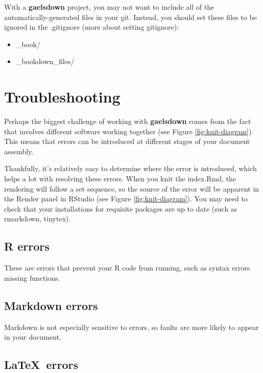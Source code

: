 \documentclass[12pt, oneside]{queensuthesis}
\numberwithin{equation}{chapter}       %
\providecommand{\tightlist}{%
  \setlength{\itemsep}{0pt}\setlength{\parskip}{0pt}}
\begin{document}
With a \textbf{gaelsdown} project, you may not want to include all of the automatically-generated files in your git. Instead, you should set these files to be ignored in the .gitignore (more about setting gitignore):
\begin{itemize}
\tightlist
\item
  \_book/
\item
  \_bookdown\_files/
\end{itemize}
\hypertarget{troubleshooting}{%
\section{Troubleshooting}\label{troubleshooting}}

Perhaps the biggest challenge of working with \textbf{gaelsdown} comes from the fact that involves different software working together (see Figure \ref{fig:knit-diagram}). This means that errors can be introduced at different stages of your document assembly.

Thankfully, it's relatively easy to determine where the error is introduced, which helps a lot with resolving these errors. When you knit the index.Rmd, the rendering will follow a set sequence, so the source of the error will be apparent in the Render panel in RStudio (see Figure \ref{fig:knit-diagram}). You may need to check that your installations for requisite packages are up to date (such as rmarkdown, tinytex).

\hypertarget{r-errors}{%
\subsection{R errors}\label{r-errors}}

These are errors that prevent your R code from running, such as syntax errors missing functions.

\hypertarget{markdown-errors}{%
\subsection{Markdown errors}\label{markdown-errors}}

Markdown is not especially sensitive to errors, so faults are more likely to appear in your document.

\hypertarget{errors}{%
\subsection{\texorpdfstring{\LaTeX~errors}{~errors}}\label{errors}}
\end{document}

